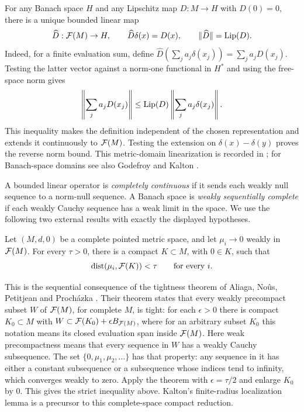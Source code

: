 For any Banach space \(H\) and any Lipschitz map \(D:M\to H\) with
\(D(0)=0\), there is a unique bounded linear map
\begin{equation}
\label{eq:linearization}
 \widehat D:\mathcal F(M)\to H,\qquad
 \widehat D\delta(x)=D(x),\qquad
 \|\widehat D\|=\operatorname{Lip}(D).
\end{equation}
Indeed, for a finite evaluation sum, define
\(\widehat D(\sum_j a_j\delta(x_j))=\sum_j a_jD(x_j)\).
Testing the latter vector against a norm-one functional in \(H^*\)
and using the free-space norm gives
\[
 \left\|\sum_j a_jD(x_j)\right\|
 \le \operatorname{Lip}(D)\left\|\sum_j a_j\delta(x_j)\right\|.
\]
This inequality makes the definition independent of the chosen
representation and extends it continuously to \(\mathcal F(M)\).
Testing the extension on \(\delta(x)-\delta(y)\) proves the reverse
norm bound. This metric-domain linearization is recorded in
\cite[Lemma~3.2]{Kalton04}; for Banach-space domains see also
Godefroy and Kalton \cite[Lemma~2.5]{GK03}.

A bounded linear operator is \emph{completely continuous} if it sends
each weakly null sequence to a norm-null sequence. A Banach space is
\emph{weakly sequentially complete} if each weakly Cauchy sequence
has a weak limit in the space. We use the following two external
results with exactly the displayed hypotheses.

\begin{theorem}
\label{thm:compact-reduction}
Let \((M,d,0)\) be a complete pointed metric space, and let
\(\mu_i\to0\) weakly in \(\mathcal F(M)\). For every \(\tau>0\), there is a
compact \(K\subset M\), with \(0\in K\), such that
\[
 \operatorname{dist}(\mu_i,\mathcal F(K))<\tau\qquad\hbox{for every }i.
\]
\end{theorem}

This is the sequential consequence of the tightness theorem of
Aliaga, No\^us, Petitjean and Proch\'azka
\cite[Theorem~2.3, arXiv version cited in the bibliography]{ANPP21}.
Their theorem states that every weakly precompact subset \(W\) of
\(\mathcal F(M)\), for complete \(M\), is tight: for each \(\epsilon>0\)
there is compact \(K_0\subset M\) with
\(W\subset\mathcal F(K_0)+\epsilon B_{\mathcal F(M)}\), where for an arbitrary
subset \(K_0\) this notation means its closed evaluation span inside
\(\mathcal F(M)\).
Here weak precompactness means that every sequence in \(W\) has a
weakly Cauchy subsequence. The set \(\{0,\mu_1,\mu_2,\ldots\}\)
has that property: any sequence in it has either a constant
subsequence or a subsequence whose indices tend to infinity, which
converges weakly to zero. Apply the theorem with \(\epsilon=\tau/2\)
and enlarge \(K_0\) by \(0\). This gives the strict inequality above.
Kalton's finite-radius localization lemma
\cite[Lemma~4.5]{Kalton04} is a precursor to this complete-space
compact reduction.

